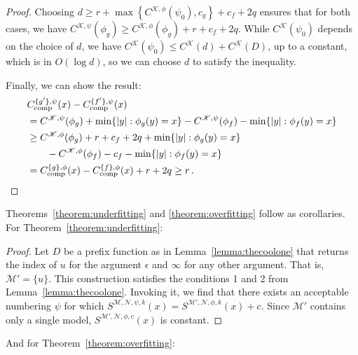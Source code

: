 \documentclass{style/llncs}
\newcommand{\M}{\mathscr M}
\newcommand{\K}{\mathscr K}
\newcommand{\Nm}{\mathscr N}
\newcommand{\tn}[1]{\textnormal{#1}}
\newcommand{\Cc}{C_\tn{comp}}
\newcommand{\p}{\,\text{.}}
\begin{document}
\begin{proof}
Choosing $d \geq r + \max \left\{C^{\K,\phi}(\psi_0), c_g \right\} + c_f + 2q$ ensures that for both cases, we have $C^{\K, \psi}(\phi_g) \geq C^{\K, \phi}(\phi_g) + r + c_f + 2q$. While $C^\K(\psi_0)$ depends on the choice of $d$, we have $C^\K(\psi_0) \leq C^\K(d) + C^\K(D)$, up to a constant, which is in $O(\log d)$, so we can choose $d$ to satisfy the inequality.  

Finally, we can show the result: \belowdisplayskip=-26pt
\begin{align*}
&\Cc^{\{g'\}, \psi}(x) - \Cc^{\{f'\}, \psi}(x)\\
&=C^{\K, \psi}(\phi_g) + \min\{|y| : \phi_g(y) = x\} - C^{\K, \psi}(\phi_f) - \min\{|y| : \phi_f(y) = x\}\\
&\geq C^{\K, \phi}(\phi_g) + r + c_f + 2q + \min\{|y| : \phi_g(y) = x\} \\
&\quad\quad- C^{\K, \phi}(\phi_f) - c_f - \min\{|y| : \phi_f(y) = x\} \\
&= \Cc^{\{g\}, \phi}(x) - \Cc^{\{f\}, \phi}(x) + r + 2q\geq r \p\\
\end{align*}
\end{proof}
Theorems~\ref{theorem:underfitting} and \ref{theorem:overfitting} follow as corollaries. For Theorem~\ref{theorem:underfitting}:
\begin{proof}
Let $D$ be a prefix function as in Lemma~\ref{lemma:thecoolone} that returns the index of $u$ for the argument $\epsilon$ and $\infty$ for any other argument. That is, $\M' = \{u\}$. This construction satisfies the conditions 1 and 2 from Lemma~\ref{lemma:thecoolone}. Invoking it, we find that there exists an acceptable numbering $\psi$ for which $S^{\M,\Nm,\psi,k}(x) = S^{\M',\Nm,\phi,k}(x) + c$. Since $\M'$ contains only a single model, $S^{\M',\Nm,\phi, c}(x)$ is constant.
\end{proof}
And for Theorem~\ref{theorem:overfitting}:
\end{document}
